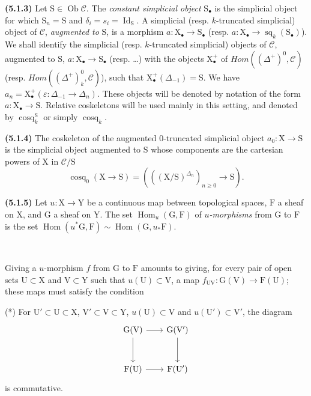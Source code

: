 \documentclass[11pt,leqno]{article}
\newcommand{\Page}[1]{\ifvmode\noindent\else\unskip\ \fi{\footnotesize\textcolor{gray}{[p.\,#1]}}\ \ignorespaces}
\begin{document}
\textbf{(5.1.3)} Let \(\mathrm{S}\in\operatorname{Ob}\mathscr{C}\). The \textit{constant simplicial object} \(\mathrm{S}_{\bullet}\) is the simplicial object for which \(\mathrm{S}_n=\mathrm{S}\) and \(\delta_i=s_i=\operatorname{Id}_{\mathrm{S}}\). A simplicial (resp. \(k\)-truncated simplicial) object of \(\mathscr{C}\), \textit{augmented to} \(\mathrm{S}\), is a morphism \(a:\mathrm{X}_{\bullet}\to\mathrm{S}_{\bullet}\) (resp. \(a:\mathrm{X}_{\bullet}\to\operatorname{sq}_k(\mathrm{S}_{\bullet})\)). We shall identify the simplicial (resp. \(k\)-truncated simplicial) objects of \(\mathscr{C}\), augmented to \(\mathrm{S}\), \(a:\mathrm{X}_{\bullet}\to\mathrm{S}_{\bullet}\) (resp. …) with the objects \(\mathrm{X}_{\bullet}^{+}\) of \(\mathit{Hom}((\Delta^+)^0,\mathscr{C})\) (resp. \(\mathit{Hom}((\Delta^+)_k^0,\mathscr{C})\)), such that \(\mathrm{X}_{\bullet}^{+}(\Delta_{-1})=\mathrm{S}\). We have \(a_n=\mathrm{X}_{\bullet}^{+}(\varepsilon:\Delta_{-1}\to\Delta_n)\). These objects will be denoted by notation of the form \(a:\mathrm{X}_{\bullet}\to\mathrm{S}\). Relative coskeletons will be used mainly in this setting, and denoted by \(\operatorname{cosq}_k^{\mathrm{S}}\) or simply \(\operatorname{cosq}_k\).

\textbf{(5.1.4)} The coskeleton of the augmented 0-truncated simplicial object \(a_0:\mathrm{X}\to\mathrm{S}\) is the simplicial object augmented to \(\mathrm{S}\) whose components are the cartesian powers of \(\mathrm{X}\) in \(\mathscr{C}/\mathrm{S}\)
\[
\operatorname{cosq}_0(\mathrm{X}\to\mathrm{S})
=(((\mathrm{X}/\mathrm{S})^{\Delta_n})_{n\geq0}\to\mathrm{S}).
\]

\textbf{(5.1.5)} Let \(u:\mathrm{X}\to\mathrm{Y}\) be a continuous map between topological spaces, \(\mathrm{F}\) a sheaf on \(\mathrm{X}\), and \(\mathrm{G}\) a sheaf on \(\mathrm{Y}\). The set \(\operatorname{Hom}_u(\mathrm{G},\mathrm{F})\) of \textit{\(u\)-morphisms} from \(\mathrm{G}\) to \(\mathrm{F}\) is the set \(\operatorname{Hom}(u^*\mathrm{G},\mathrm{F})\sim\operatorname{Hom}(\mathrm{G},u_*\mathrm{F})\).

\Page{10}

Giving a \(u\)-morphism \(f\) from \(\mathrm{G}\) to \(\mathrm{F}\) amounts to giving, for every pair of open sets \(\mathrm{U}\subset\mathrm{X}\) and \(\mathrm{V}\subset\mathrm{Y}\) such that \(u(\mathrm{U})\subset\mathrm{V}\), a map \(f_{\mathrm{UV}}:\mathrm{G}(\mathrm{V})\to\mathrm{F}(\mathrm{U})\); these maps must satisfy the condition

\noindent (*) For \(\mathrm{U}'\subset\mathrm{U}\subset\mathrm{X}\), \(\mathrm{V}'\subset\mathrm{V}\subset\mathrm{Y}\), \(u(\mathrm{U})\subset\mathrm{V}\) and \(u(\mathrm{U}')\subset\mathrm{V}'\), the diagram
\[
\begin{tikzcd}[column sep=2em, row sep=3em]
\mathrm{G}(\mathrm{V}) \arrow[r] \arrow[d]
  & \mathrm{G}(\mathrm{V}') \arrow[d] \\
\mathrm{F}(\mathrm{U}) \arrow[r]
  & \mathrm{F}(\mathrm{U}')
\end{tikzcd}
\]
is commutative.
\end{document}
